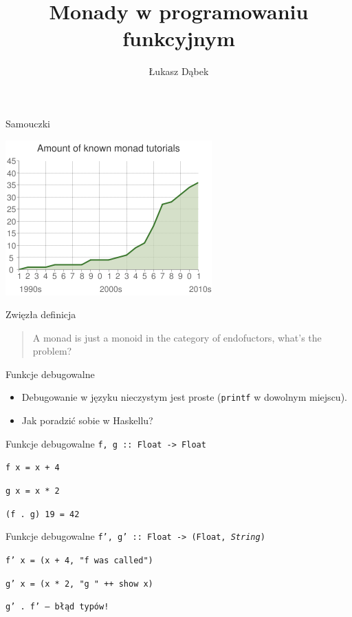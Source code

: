 \documentclass[14pt]{beamer}
\title{Monady w programowaniu funkcyjnym}
\author{Łukasz Dąbek}
\begin{document}
\begin{frame}[plain]
    \titlepage
\end{frame}

\begin{frame}{Samouczki}
    \begin{center}
        \includegraphics[scale=0.5]{monads-timeline.png}
    \end{center}
\end{frame}

\begin{frame}{Zwięzła definicja}
    \begin{quote}
        A monad is just a monoid in the category of endofuctors,
        what's the problem?
        \vskip5mm
        \hspace*{} 
    \end{quote}
\end{frame}


\begin{frame}{Funkcje debugowalne}
    \begin{itemize}
        \item Debugowanie w języku nieczystym jest proste
            (\texttt{printf} w dowolnym miejscu).
        \pause
        \item Jak poradzić sobie w Haskellu?
    \end{itemize}
\end{frame}

\begin{frame}{Funkcje debugowalne}
    \texttt{f, g :: Float -> Float}
    \pause

    \texttt{f x = x + 4}

    \texttt{g x = x * 2}

    \texttt{(f . g) 19 = 42}
\end{frame}

\begin{frame}{Funkcje debugowalne}
    \texttt{f', g' :: Float -> (Float, \emph{String})}
    \pause

    \texttt{f' x = (x + 4, "f was called")}

    \texttt{g' x = (x * 2, "g " ++ show x)}

    \texttt{g' . f' -- błąd typów!}
\end{frame}
\end{document}
